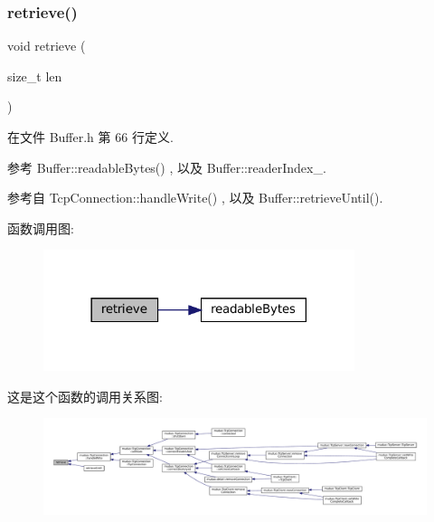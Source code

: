 \subsubsection{\texorpdfstring{retrieve()}{retrieve()}}
{\footnotesize\ttfamily void retrieve (\begin{DoxyParamCaption}\item[{size\+\_\+t}]{len }\end{DoxyParamCaption})\hspace{0.3cm}{\ttfamily [inline]}}



在文件 Buffer.\+h 第 66 行定义.



参考 Buffer\+::readable\+Bytes() , 以及 Buffer\+::reader\+Index\+\_\+.



参考自 Tcp\+Connection\+::handle\+Write() , 以及 Buffer\+::retrieve\+Until().

函数调用图\+:
\nopagebreak
\begin{figure}[H]
\begin{center}
\leavevmode
\includegraphics[width=258pt]{classmuduo_1_1Buffer_a25a9cdb4fcb89f6e3ff071517bdc09e8_cgraph}
\end{center}
\end{figure}
这是这个函数的调用关系图\+:
\nopagebreak
\begin{figure}[H]
\begin{center}
\leavevmode
\includegraphics[width=350pt]{classmuduo_1_1Buffer_a25a9cdb4fcb89f6e3ff071517bdc09e8_icgraph}
\end{center}
\end{figure}
\mbox{\label{classmuduo_1_1Buffer_af505ce71f8935bcfaa932d304c295173}} 
